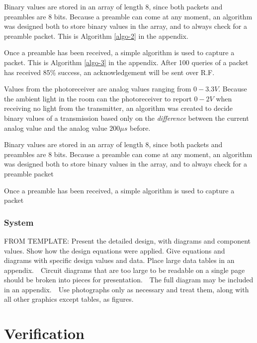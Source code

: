 \documentclass[letterpaper,10pt]{article}
\begin{document}
\begin{spacing}{1.15}
Binary values are stored in an array of length 8, since both packets and preambles are 8 bits. Because a preamble can come at any moment, an algorithm was designed both to store binary values in the array, and to always check for a preamble packet. This is Algorithm \ref{algo-2} in the appendix.

Once a preamble has been received, a simple algorithm is used to capture a packet. This is Algorithm \ref{algo-3} in the appendix. After 100 queries of a packet has received 85\% success, an acknowledgement will be sent over R.F.


Values from the photoreceiver are analog values ranging from $0-3.3V$. Because the ambient light in the room can the photoreceiver to report $0-2V$ when receiving no light from the transmitter, an algorithm was created to decide binary values of a transmission based only on the \textit{difference} between the current analog value and the analog value $200 \mu s$ before.


\makeatletter
\def\BState{\State\hskip-\ALG@thistlm}
\makeatother


Binary values are stored in an array of length 8, since both packets and preambles are 8 bits. Because a preamble can come at any moment, an algorithm was designed both to store binary values in the array, and to always check for a preamble packet 



Once a preamble has been received, a simple algorithm is used to capture a packet

\subsubsection{System}

FROM TEMPLATE: Present the detailed design, with diagrams and component values. Show how the design equations were applied. Give equations and diagrams with specific design values and data. Place large data tables in an appendix.  Circuit diagrams that are too large to be readable on a single page should be broken into pieces for presentation.  The full diagram may be included in an appendix.  Use photographs only as necessary and treat them, along with all other graphics except tables, as figures.


\section{Verification}


\end{spacing}
\end{document}
